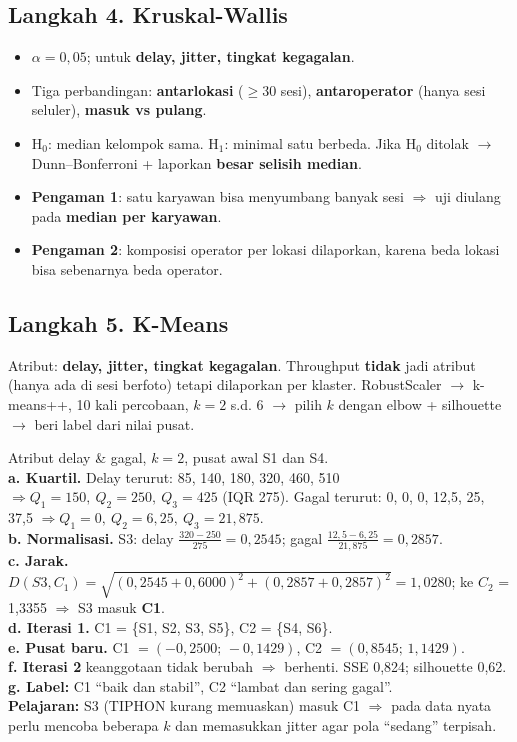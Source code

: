 \subsection*{Langkah 4. Kruskal-Wallis}
\begin{itemize}
  \item $\alpha=0{,}05$; untuk \textbf{delay, jitter, tingkat kegagalan}.
  \item Tiga perbandingan: \textbf{antarlokasi} ($\geq30$ sesi), \textbf{antaroperator} (hanya sesi seluler), \textbf{masuk vs pulang}.
  \item H$_0$: median kelompok sama. H$_1$: minimal satu berbeda. Jika H$_0$ ditolak $\rightarrow$ Dunn--Bonferroni + laporkan \textbf{besar selisih median}.
  \item \textbf{Pengaman 1}: satu karyawan bisa menyumbang banyak sesi $\Rightarrow$ uji diulang pada \textbf{median per karyawan}.
  \item \textbf{Pengaman 2}: komposisi operator per lokasi dilaporkan, karena beda lokasi bisa sebenarnya beda operator.
\end{itemize}

\subsection*{Langkah 5. K-Means}
Atribut: \textbf{delay, jitter, tingkat kegagalan}. Throughput \textbf{tidak} jadi atribut (hanya ada di sesi berfoto) tetapi dilaporkan per klaster. RobustScaler $\rightarrow$ k-means++, 10 kali percobaan, $k=2$ s.d. $6$ $\rightarrow$ pilih $k$ dengan elbow + silhouette $\rightarrow$ beri label dari nilai pusat.
\begin{contoh}
Atribut delay \& gagal, $k=2$, pusat awal S1 dan S4.\\
\textbf{a. Kuartil.} Delay terurut: 85, 140, 180, 320, 460, 510 $\Rightarrow Q_1=150,\ Q_2=250,\ Q_3=425$ (IQR 275). Gagal terurut: 0, 0, 0, 12,5, 25, 37,5 $\Rightarrow Q_1=0,\ Q_2=6{,}25,\ Q_3=21{,}875$.\\
\textbf{b. Normalisasi.} S3: delay $\frac{320-250}{275}=0{,}2545$; gagal $\frac{12{,}5-6{,}25}{21{,}875}=0{,}2857$.\\
\textbf{c. Jarak.} $D(S3,C_1)=\sqrt{(0{,}2545+0{,}6000)^2+(0{,}2857+0{,}2857)^2}=1{,}0280$; ke $C_2$ = 1,3355 $\Rightarrow$ S3 masuk \textbf{C1}.\\
\textbf{d. Iterasi 1.} C1 = \{S1, S2, S3, S5\}, C2 = \{S4, S6\}.\\
\textbf{e. Pusat baru.} C1 $=(-0{,}2500;\,-0{,}1429)$, C2 $=(0{,}8545;\,1{,}1429)$.\\
\textbf{f. Iterasi 2} keanggotaan tidak berubah $\Rightarrow$ berhenti. SSE 0,824; silhouette 0,62.\\
\textbf{g. Label:} C1 ``baik dan stabil'', C2 ``lambat dan sering gagal''.\\
\textbf{Pelajaran:} S3 (TIPHON kurang memuaskan) masuk C1 $\Rightarrow$ pada data nyata perlu mencoba beberapa $k$ dan memasukkan jitter agar pola ``sedang'' terpisah.
\end{contoh}

